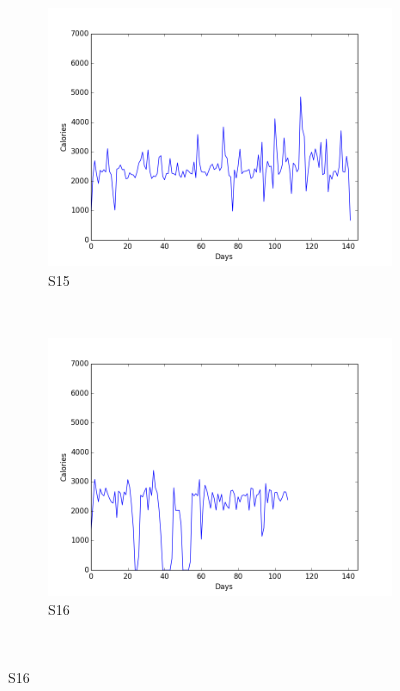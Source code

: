 \documentclass[12pt]{article} %
\begin{document}
\begin{figure}[H]
    \begin{subfigure}[b]{0.30\textwidth}
        \includegraphics[width=\textwidth]{img/graphs/15-calories-1}
        \caption{S15}
        \label{fig:s15cal}
    \end{subfigure}
    ~ %
    \begin{subfigure}[b]{0.30\textwidth}
        \includegraphics[width=\textwidth]{img/graphs/16-calories-1}
        \caption{S16}
        \label{fig:s16cal}
    \end{subfigure}
    ~ %

\end{figure}
\end{document}
